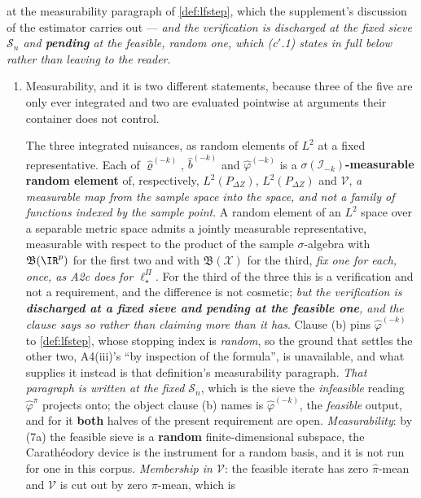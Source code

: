 \begin{definition}
\begin{enumerate}
at the measurability paragraph of \cref{def:lfstep}, which the supplement's discussion of the estimator
carries out --- \emph{and the verification is discharged at the fixed sieve $\mathcal S_n$ and
\textbf{pending} at the feasible, random one, which \textup{(c$'$.1)} states in full below rather than
leaving to the reader}.
\begin{enumerate}
\item[(c$'$.1)] Measurability, and it is two different statements, because three of the five are
only ever integrated and two are evaluated pointwise at arguments their container does not control.

The three integrated nuisances, as random elements of $L^{2}$ at a fixed representative. Each of
$\hat\varrho^{(-k)}$, $\hat b^{(-k)}$ and $\hat\varphi^{(-k)}$ is a
\textbf{$\sigma(\mathcal I_{-k})$-measurable random element} of, respectively, $L^{2}(P_{\Delta Z})$,
$L^{2}(P_{\Delta Z})$ and $\mathcal V$, \emph{a measurable map from the sample space into the space, and
not a family of functions indexed by the sample point}. A random element of an $L^{2}$ space over a
separable metric space admits a jointly measurable representative, measurable with respect to the
product of the sample $\sigma$-algebra with $\mathfrak B(\IR^{p})$ for the first two and with
$\mathfrak B(\mathcal X)$ for the third, \emph{fix one for each, once, as A2c does for
$\ell^\Pi_\star$}.
For the third of the three this is a verification and not a requirement, and the
difference is not cosmetic; \emph{but the verification is \textbf{discharged at a fixed sieve and
pending at the feasible one}, and the clause says so rather than claiming more than it has}. Clause \textup{(b)} pins $\hat\varphi^{(-k)}$ to \cref{def:lfstep}, whose
stopping index is \emph{random}, so the ground that settles the other two, A4(iii)'s ``by inspection of the
formula'', is unavailable, and what supplies it instead is that definition's measurability paragraph.
\emph{That paragraph is written at the fixed $\mathcal S_n$}, which is the sieve the \emph{infeasible}
reading $\hat\varphi^{\pi}$ projects onto; the object clause \textup{(b)} names is $\hat\varphi^{(-k)}$,
the \emph{feasible} output, and for it \textbf{both} halves of the present requirement are open.
\emph{Measurability}: by \textup{(7a)} the feasible sieve is a \textbf{random}
finite-dimensional subspace, the Carath\'eodory device is the instrument for a random basis, and it is
not run for one in this corpus. \emph{Membership in $\mathcal V$}: the feasible iterate has zero
$\hat\pi$-mean and $\mathcal V$ is cut out by zero $\pi$-mean, which is

\end{enumerate}
\end{enumerate}
\end{definition}

